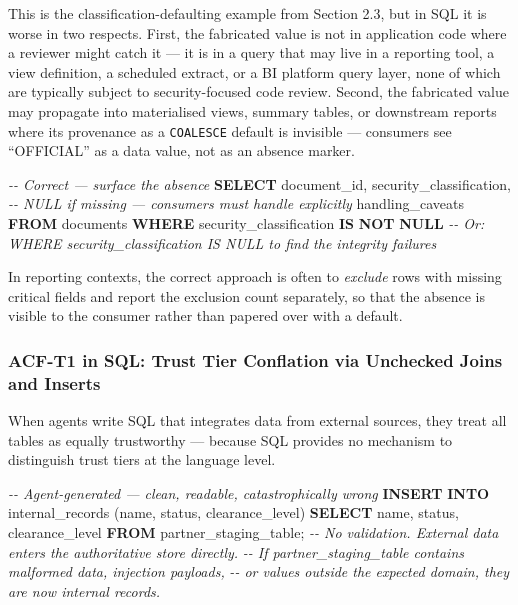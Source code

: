 \documentclass[a4paper,11pt]{report}
\newenvironment{Shaded}{\begin{snugshade}}{\end{snugshade}}
\newcommand{\CommentTok}[1]{\textcolor[rgb]{0.56,0.35,0.01}{\textit{#1}}}
\newcommand{\KeywordTok}[1]{\textcolor[rgb]{0.13,0.29,0.53}{\textbf{#1}}}
\newcommand{\NormalTok}[1]{#1}
\begin{document}
This is the classification-defaulting example from Section 2.3, but in
SQL it is worse in two respects. First, the fabricated value is not in
application code where a reviewer might catch it --- it is in a query
that may live in a reporting tool, a view definition, a scheduled
extract, or a BI platform query layer, none of which are typically
subject to security-focused code review. Second, the fabricated value
may propagate into materialised views, summary tables, or downstream
reports where its provenance as a \texttt{COALESCE} default is invisible
--- consumers see ``OFFICIAL'' as a data value, not as an absence
marker.

\begin{Shaded}
\begin{Highlighting}[]
\CommentTok{{-}{-} Correct — surface the absence}
\KeywordTok{SELECT}
\NormalTok{    document\_id,}
\NormalTok{    security\_classification,  }\CommentTok{{-}{-} NULL if missing — consumers must handle explicitly}
\NormalTok{    handling\_caveats}
\KeywordTok{FROM}\NormalTok{ documents}
\KeywordTok{WHERE}\NormalTok{ security\_classification }\KeywordTok{IS} \KeywordTok{NOT} \KeywordTok{NULL}
\CommentTok{{-}{-} Or: WHERE security\_classification IS NULL to find the integrity failures}
\end{Highlighting}
\end{Shaded}

In reporting contexts, the correct approach is often to \emph{exclude}
rows with missing critical fields and report the exclusion count
separately, so that the absence is visible to the consumer rather than
papered over with a default.

\hypertarget{acf-t1-in-sql-trust-tier-conflation-via-unchecked-joins-and-inserts}{%
\subsubsection{ACF-T1 in SQL: Trust Tier Conflation via Unchecked Joins
and
Inserts}\label{acf-t1-in-sql-trust-tier-conflation-via-unchecked-joins-and-inserts}}

When agents write SQL that integrates data from external sources, they
treat all tables as equally trustworthy --- because SQL provides no
mechanism to distinguish trust tiers at the language level.

\begin{Shaded}
\begin{Highlighting}[]
\CommentTok{{-}{-} Agent{-}generated — clean, readable, catastrophically wrong}
\KeywordTok{INSERT} \KeywordTok{INTO}\NormalTok{ internal\_records (name, status, clearance\_level)}
\KeywordTok{SELECT}\NormalTok{ name, status, clearance\_level}
\KeywordTok{FROM}\NormalTok{ partner\_staging\_table;}
\CommentTok{{-}{-} No validation. External data enters the authoritative store directly.}
\CommentTok{{-}{-} If partner\_staging\_table contains malformed data, injection payloads,}
\CommentTok{{-}{-} or values outside the expected domain, they are now internal records.}
\end{Highlighting}
\end{Shaded}
\end{document}
